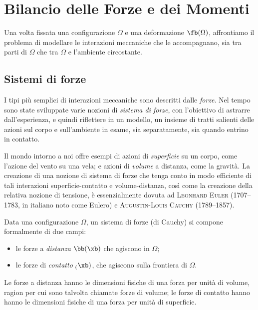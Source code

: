 \chapter{Bilancio delle Forze e dei Momenti}

Una volta fissata una configurazione $\Omega$ e una deformazione $\fb(\Omega)$,  affrontiamo il problema di modellare le interazioni meccaniche che le accompagnano, sia tra parti di $\Omega$ che tra $\Omega$ e l'ambiente circostante.  


\section{Sistemi di forze}
I tipi più semplici di interazioni meccaniche sono descritti dalle \textit{forze}. Nel tempo sono state sviluppate varie nozioni di  \textit{sistema di forze}, con l'obiettivo di  astrarre dall'esperienza, e quindi riflettere in un modello, un insieme di tratti salienti  delle azioni sul corpo e sull'ambiente in esame, sia separatamente, sia quando entrino in contatto. 

Il mondo intorno a noi offre esempi di azioni di \textit{superficie} su un corpo, come l'azione del vento su una vela; e azioni di \textit{volume} a distanza, come la gravità. La creazione di una nozione di sistema di forze che tenga conto in modo efficiente di tali interazioni superficie-contatto e volume-distanza, così come la creazione della relativa nozione di tensione, è essenzialmente dovuta ad \textsc{Leonhard Euler} (1707--1783, in italiano noto come Eulero) e \textsc{Augustin-Louis Cauchy} (1789--1857).


Data una configurazione $\Omega$, un sistema di forze (di Cauchy) si compone  formalmente di due campi:
\begin{itemize}
	\item le forze a \textit{distanza} $\bb(\xb)$  che agiscono in $\Omega$;
	\item le forze di \textit{contatto} $\sb(\xb)$, che agiscono sulla frontiera di $\Omega$.
\end{itemize}
Le forze a distanza hanno le dimensioni fisiche di una forza per unità di volume, ragion per cui sono talvolta chiamate forze di volume; le forze di contatto hanno  hanno le dimensioni fisiche di una forza per unità di superficie. 

